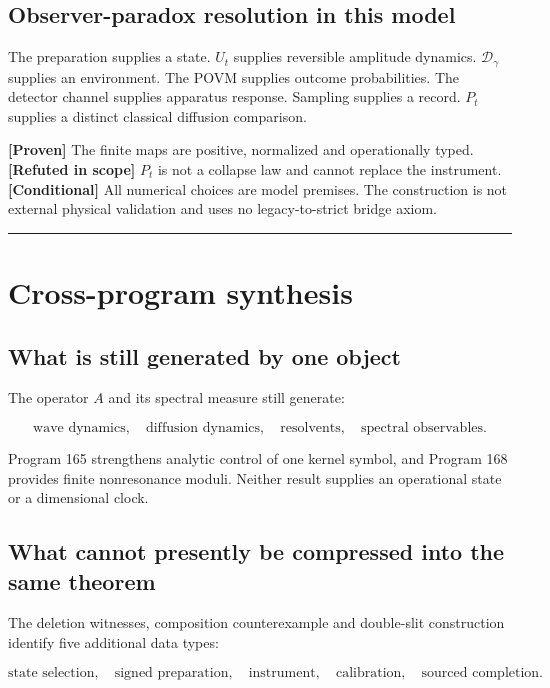 \documentclass[11pt,a4paper,openany]{report}
\newcommand{\statusProven}{\textcolor{fingreen}{[Proven]}}
\newcommand{\statusConditional}{\textcolor{finorange}{[Conditional]}}
\newcommand{\statusRefuted}{\textcolor{finred}{[Refuted in scope]}}
\begin{document}
\section{Observer-paradox resolution in this model}

The preparation supplies a state. \(U_t\) supplies reversible amplitude dynamics. \(\mathcal D_\gamma\) supplies an environment. The POVM supplies outcome probabilities. The detector channel supplies apparatus response. Sampling supplies a record. \(P_t\) supplies a distinct classical diffusion comparison.

\textbf{\statusProven{}} The finite maps are positive, normalized and operationally typed. \textbf{\statusRefuted{}} \(P_t\) is not a collapse law and cannot replace the instrument. \textbf{\statusConditional{}} All numerical choices are model premises. The construction is not external physical validation and uses no legacy-to-strict bridge axiom.

\par\medskip\hrule\medskip

\chapter{Cross-program synthesis}

\section{What is still generated by one object}

The operator \(A\) and its spectral measure still generate:

\[
\text{wave dynamics},\quad
\text{diffusion dynamics},\quad
\text{resolvents},\quad
\text{spectral observables}.
\]

Program 165 strengthens analytic control of one kernel symbol, and Program 168 provides finite nonresonance moduli. Neither result supplies an operational state or a dimensional clock.

\section{What cannot presently be compressed into the same theorem}

The deletion witnesses, composition counterexample and double-slit construction identify five additional data types:

\[
\text{state selection},\quad
\text{signed preparation},\quad
\text{instrument},\quad
\text{calibration},\quad
\text{sourced completion}.
\]
\end{document}
